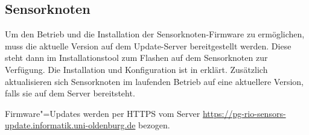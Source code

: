 \subsection{Sensorknoten}
Um den Betrieb und die Installation der Sensorknoten-Firmware zu ermöglichen, muss die aktuelle Version auf dem Update-Server bereitgestellt werden.
Diese steht dann im Installationstool zum Flashen auf dem Sensorknoten zur Verfügung. Die Installation und Konfiguration ist in  erklärt. Zusätzlich aktualisieren sich Sensorknoten im laufenden Betrieb auf eine aktuellere Version, falls sie auf dem Server bereitsteht.

Firmware"=Updates werden per HTTPS vom Server \url{https://pg-rio-sensors-update.informatik.uni-oldenburg.de} bezogen.
 